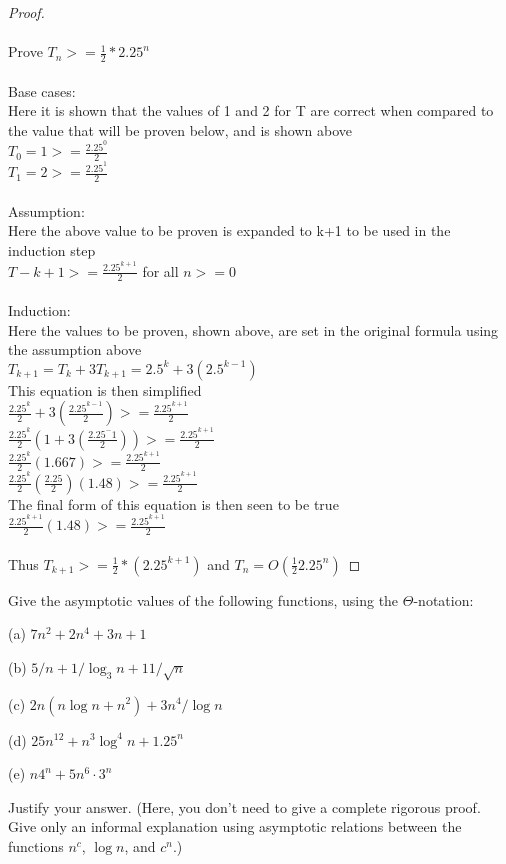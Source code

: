 \documentclass{article}
\begin{document}
\begin{solution}
\begin{proof}
\\\\Prove $T_n>=\frac{1}{2}*2.25^n$
\\\\Base cases:
\\Here it is shown that the values of 1 and 2 for T are correct when compared to the value that will be proven below, and is shown above
\\$T_0=1 >= \frac{2.25^0}{2}$
\\$T_1=2 >= \frac{2.25^1}{2}$
\\\\Assumption:
\\Here the above value to be proven is expanded to k+1 to be used in the induction step
\\$T-{k+1} >= \frac{2.25^{k+1}}{2}$ for all $n>=0$
\\\\Induction:
\\Here the values to be proven, shown above, are set in the original formula using the assumption above
\\$T_{k+1}=T_k+3T_{k+1}=2.5^k+3(2.5^{k-1})$
\endline
\\This equation is then simplified
\\$\frac{2.25^k}{2}+3(\frac{2.25^{k-1}}{2}) >= \frac{2.25^{k+1}}{2}$
\\$\frac{2.25^k}{2}(1+3(\frac{2.25^-1}{2})) >= \frac{2.25^{k+1}}{2}$
\\$\frac{2.25^k}{2}(1.667) >= \frac{2.25^{k+1}}{2}$
\\ $\frac{2.25^k}{2}(\frac{2.25}{2})(1.48) >= \frac{2.25^{k+1}}{2}$
\endline
\\The final form of this equation is then seen to be true
\\ $\frac{2.25^{k+1}}{2}(1.48) >= \frac{2.25^{k+1}}{2}$
\\\\Thus $T_{k+1} >= \frac{1}{2}*(2.25^{k+1})$ and $T_n = O(\frac{1}{2}2.25^n)$

\end{proof}

\end{solution}


\begin{problem}
Give the asymptotic values of the
following functions, using the $\Theta$-notation:
%
\begin{description}
%
\item{(a)} $7n^2 + 2n^4 + 3n + 1$
\item{(b)} $5/n + 1/\log_3 n + 11/\sqrt{n}$
\item{(c)} $2n ( n\log n + n^2) + 3n^4/\log n$
\item{(d)} $25n^{12}  + n^3\log^4 n +  1.25^n$
\item{(e)} $n4^n + 5n^6\cdot 3^n$
%
\end{description}
%
Justify your answer.
(Here, you don't need to give a complete rigorous proof.
Give only an informal explanation using asymptotic
relations between the functions $n^c$, $\log n$, and $c^n$.)
\end{problem}
\end{document}
